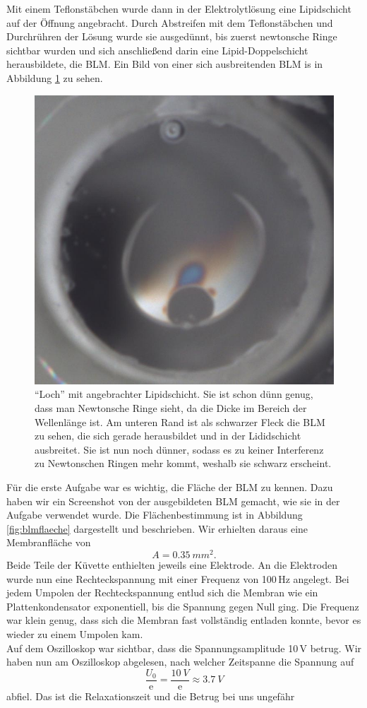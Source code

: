 \documentclass[a4paper,ngerman]{scrartcl}
\begin{document}
Mit einem Teflonstäbchen wurde dann in der Elektrolytlösung eine Lipidschicht auf der Öffnung angebracht. Durch Abstreifen mit dem 
Teflonstäbchen und Durchrühren der Lösung wurde sie ausgedünnt, bis zuerst newtonsche Ringe sichtbar wurden und sich anschließend 
darin eine Lipid-Doppelschicht herausbildete, die BLM. Ein Bild von einer sich ausbreitenden BLM is in Abbildung \ref{fig:newton} zu sehen.

\begin{figure}[tbh!]
  \centering
  \includegraphics[width=.4\textwidth]{abbildungen/newton2_cut.jpg}
  \caption{"`Loch"' mit angebrachter Lipidschicht. Sie ist schon dünn genug, dass man Newtonsche Ringe sieht, da die Dicke im Bereich der Wellenlänge ist. Am unteren Rand ist als schwarzer Fleck die BLM zu sehen, die sich gerade herausbildet und in der Lididschicht ausbreitet.
Sie ist nun noch dünner, sodass es zu keiner Interferenz zu Newtonschen Ringen mehr kommt, weshalb sie schwarz erscheint.}
  \label{fig:newton}
\end{figure}

Für die erste Aufgabe war es wichtig, die Fläche der BLM zu kennen. Dazu haben wir ein Screenshot von der ausgebildeten BLM gemacht, wie sie 
in der Aufgabe verwendet wurde. Die Flächenbestimmung ist in Abbildung \ref{fig:blmflaeche} dargestellt und beschrieben. 
Wir erhielten daraus eine Membranfläche von 
\begin{equation} A = \SI{0,35}{mm^2}.\label{eq:area}\end{equation}
Beide Teile der Küvette enthielten jeweils eine Elektrode. An die Elektroden
wurde nun eine Rechteckspannung mit einer Frequenz von 100\,Hz angelegt. Bei jedem Umpolen der Rechteckspannung entlud sich die Membran wie ein Plattenkondensator exponentiell, bis die Spannung gegen Null ging. Die Frequenz war klein genug, dass sich die Membran fast vollständig entladen konnte, bevor es wieder zu einem Umpolen kam.\\

Auf dem Oszilloskop war sichtbar, dass die Spannungsamplitude 10\,V betrug. Wir haben nun am Oszilloskop abgelesen, nach welcher Zeitspanne die Spannung auf
\begin{equation}
 \frac{U_0}{\mathrm{e}} = \frac{\SI{10}{V}}{\mathrm{e}} \approx \SI{3,7}{V} 
\end{equation}
abfiel. Das ist die Relaxationszeit und die Betrug bei uns ungefähr
\end{document}
